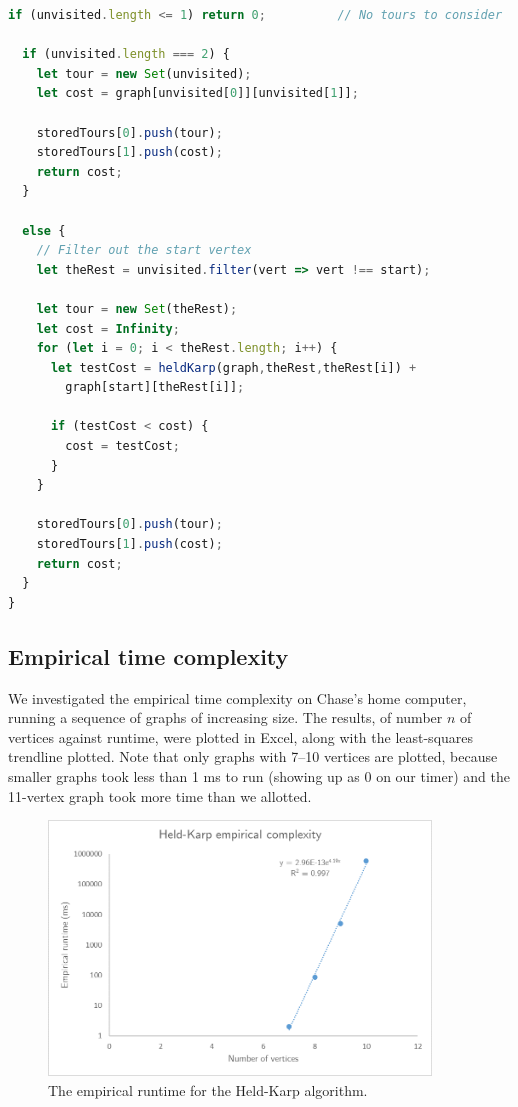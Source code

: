 \documentclass[10pt]{extarticle}
\begin{document}
\begin{lstlisting}[language=JavaScript]
  if (unvisited.length <= 1) return 0;          // No tours to consider

  if (unvisited.length === 2) {
    let tour = new Set(unvisited);
    let cost = graph[unvisited[0]][unvisited[1]];

    storedTours[0].push(tour);
    storedTours[1].push(cost);
    return cost;
  } 
  
  else {
    // Filter out the start vertex
    let theRest = unvisited.filter(vert => vert !== start);

    let tour = new Set(theRest);
    let cost = Infinity;
    for (let i = 0; i < theRest.length; i++) {
      let testCost = heldKarp(graph,theRest,theRest[i]) + 
        graph[start][theRest[i]];

      if (testCost < cost) {
        cost = testCost;
      }
    }

    storedTours[0].push(tour);
    storedTours[1].push(cost);
    return cost;
  }
}
\end{lstlisting}


\subsection{Empirical time complexity}
We investigated the empirical time complexity on Chase's home computer,
running a sequence of graphs of increasing size. The results, of number
$n$ of vertices against runtime, were plotted in Excel, along with the
least-squares trendline plotted. Note that only graphs with 7--10 
vertices are plotted, because smaller graphs took less than 1 ms to run
(showing up as 0 on our timer) and the 11-vertex graph took more time than
we allotted.

\begin{figure}[ht]
    \centering
    \includegraphics[width=4in]{heldKarp_trendline.png}
    \caption{The empirical runtime for the Held-Karp algorithm.}
    \label{fig:my_label}
\end{figure}
\end{document}
